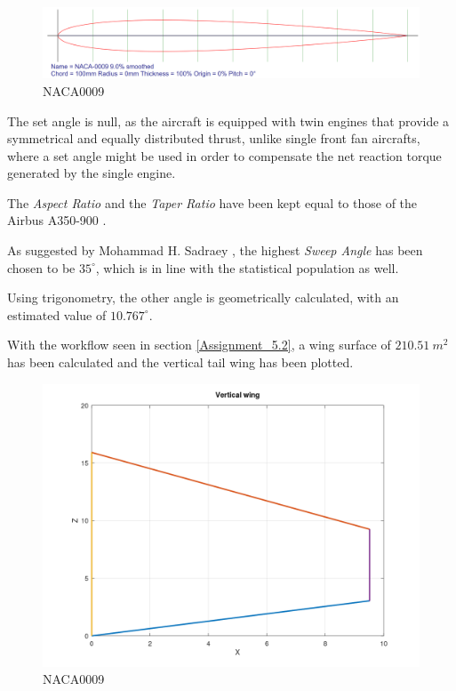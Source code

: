 \documentclass{article}
\begin{document}
\begin{figure}[h!]
    \centering
    \includegraphics[width=\textwidth]{Sources/Plots_and_Pictures/NACA0009.png}
    \caption{NACA0009 \autocite{Airfoiltools}}
    \label{NACA0009_vert}
\end{figure}

The set angle is null, as the aircraft is equipped with twin engines that provide a symmetrical and 
equally distributed thrust, unlike single front fan aircrafts, where a set angle might be used
in order to compensate the net reaction torque generated by the single engine. 

The \textit{Aspect Ratio} and the \textit{Taper Ratio} have been kept equal to those of the Airbus A350-900 \autocite{Airbus_A350-900}.

As suggested by Mohammad H. Sadraey \autocite{Sadraey_Mohammad}, the highest \textit{Sweep Angle} has been
chosen to be $35^{\circ}$, which is in line with the statistical population as well. 

Using trigonometry, the other angle is geometrically calculated, with an estimated value of $10.767^{\circ}$. 
\clearpage 

With the workflow seen in section \ref{Assignment_5.2}, a wing surface of $210.51 \ m^2$ has been calculated
and the vertical tail wing has been plotted.

\begin{figure}[h!]
    \centering
    \includegraphics[width=\textwidth]{Sources/Plots_and_Pictures/Vertical_Wing.png}
    \caption{NACA0009}
    \label{vertical_wing}
\end{figure}
\end{document}
